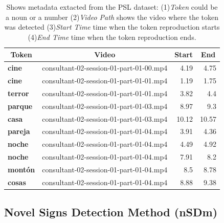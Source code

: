 \documentclass[twocolumn,conference]{article}
\begin{document}
\begin{table}[!htb]
\captionsetup{font=footnotesize}
\centering
\begin{tabular}{ l p{10em} r r }
\toprule
\multicolumn{1}{c}{\textbf{Token}} & 
	\multicolumn{1}{c}{\textbf{Video}} &
	\multicolumn{1}{c}{\textbf{Start}} &
	\multicolumn{1}{c}{\textbf{End}}\\
\midrule
\textbf{cine}&	consultant-02-session-01-part-01-00.mp4&	4.19&	4.75\\
\textbf{cine}&	consultant-02-session-01-part-01-01.mp4&	1.19&	1.75\\
\textbf{terror}&	consultant-02-session-01-part-01-01.mp4&	3.82&	4.4\\
\textbf{parque}&	consultant-02-session-01-part-01-03.mp4&	8.97&	9.3\\
\textbf{casa}&	consultant-02-session-01-part-01-03.mp4&	10.12&	10.57\\
\textbf{pareja}&	consultant-02-session-01-part-01-04.mp4&	3.91&	4.36\\
\textbf{noche}&	consultant-02-session-01-part-01-04.mp4&	4.49&	4.92\\
\textbf{noche}&	consultant-02-session-01-part-01-04.mp4&	7.91&	8.2\\
\textbf{mont\'on}&	consultant-02-session-01-part-01-04.mp4&	8.5&	8.78\\
\textbf{cosas}&	consultant-02-session-01-part-01-04.mp4&	8.88&	9.38\\
\bottomrule
\end{tabular}
\caption{Shows metadata extacted from the PSL dataset: (1)\textit{Token} could be a noun or a number (2)\textit{Video Path} shows the video where the token was detected (3)\textit{Start Time} time when the token reproduction starts (4)\textit{End Time} time when the token reproduction ends.}
\label{tab:token-video-mapping}
\end{table}

\subsection{Novel Signs Detection Method (nSDm)}\label{nsdm}
\end{document}
